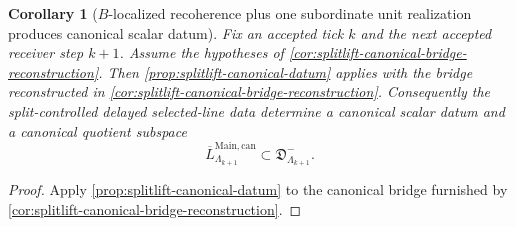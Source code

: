 \documentclass[11pt]{article}
\theoremstyle{definition}
\theoremstyle{plain}
\newtheorem{corollary}[definition]{Corollary}
\theoremstyle{remark}
\newcommand{\1}{\mathbf 1}
\begin{document}
\begin{corollary}[\(B\)-localized recoherence plus one subordinate unit realization produces canonical scalar datum]
\label{cor:splitlift-canonical-datum-from-B}
Fix an accepted tick \(k\) and the next accepted receiver step \(k+1\).
Assume the hypotheses of \cref{cor:splitlift-canonical-bridge-reconstruction}.
Then \cref{prop:splitlift-canonical-datum} applies with the bridge reconstructed in
\cref{cor:splitlift-canonical-bridge-reconstruction}.
Consequently the split-controlled delayed selected-line data determine a canonical scalar datum
and a canonical quotient subspace
\[
\overline L^{\mathrm{Main,can}}_{\Lambda_{k+1}}
\subset
\mathfrak D^-_{\Lambda_{k+1}}.
\]
\end{corollary}

\begin{proof}
Apply \cref{prop:splitlift-canonical-datum} to the canonical bridge furnished by
\cref{cor:splitlift-canonical-bridge-reconstruction}.
\end{proof}
\end{document}
